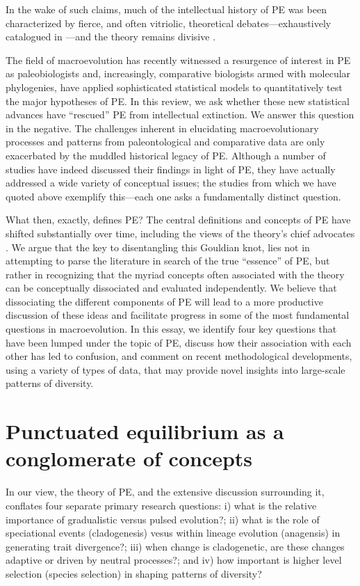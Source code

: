 In the wake of such claims, much of the intellectual history of PE was been characterized by fierce, and often vitriolic, theoretical debates---exhaustively catalogued in \citep{Levinton2001, Gould2002}---and the theory remains divisive \citep[for more on the history of the idea, see][]{Sepkoskibook}.

The field of macroevolution has recently witnessed a resurgence of interest in PE as paleobiologists and, increasingly, comparative biologists armed with molecular phylogenies, have applied sophisticated statistical models to quantitatively test the major hypotheses of PE. In this review, we ask whether these new statistical advances have ``rescued'' PE from intellectual extinction. We answer this question in the negative. The challenges inherent in elucidating macroevolutionary processes and patterns from paleontological and comparative data are only exacerbated by the muddled historical legacy of PE. Although a number of studies have indeed discussed their findings in light of PE, they have actually addressed a wide variety of conceptual issues; the studies from which we have quoted above exemplify this---each one asks a fundamentally distinct question.

What then, exactly, defines PE? The central definitions and concepts of PE have shifted substantially over time, including the views of the theory's chief advocates \citep[for analysis, see][]{Mayr1982, Ruse1989, Sepkoskibook}. We argue that the key to disentangling this Gouldian knot, lies not in attempting to parse the literature in search of the true ``essence'' of PE, but rather in recognizing that the myriad concepts often associated with the theory can be conceptually dissociated and evaluated independently. We believe that dissociating the different components of PE will lead to a more productive discussion of these ideas and facilitate progress in some of the most fundamental questions in macroevolution. In this essay, we identify four key questions that have been lumped under the topic of PE, discuss how their association with each other has led to confusion, and comment on recent methodological developments, using a variety of types of data, that may provide novel insights into large-scale patterns of diversity.

\section{Punctuated equilibrium as a conglomerate of concepts}

In our view, the theory of PE, and the extensive discussion surrounding it, conflates four separate primary research questions: i) what is the relative importance of gradualistic versus pulsed evolution?; ii) what is the role of speciational events (cladogenesis) vesus within lineage evolution (anagensis) in generating trait divergence?; iii) when change is cladogenetic, are these changes adaptive or driven by neutral processes?; and iv) how important is higher level selection (species selection) in shaping patterns of diversity? 

